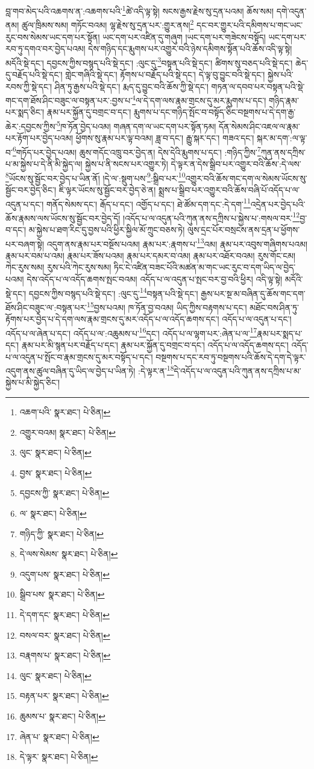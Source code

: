 བླ་གབ་མེད་པའི་འཆགས་ན་:འཆགས་པའི་\footnote{འཆག་པའི་  སྣར་ཐང་།  པེ་ཅིན། }ཚེ་འདི་ལྟ་སྟེ། སངས་རྒྱས་རྗེས་སུ་དྲན་པའམ། ཆོས་སམ། དགེ་འདུན་ནམ། ཚུལ་ཁྲིམས་སམ། གཏོང་བའམ། ལྷ་རྗེས་སུ་དྲན་པར་:གྱུར་ནས།\footnote{འགྱུར་བའམ།  སྣར་ཐང་།  པེ་ཅིན། } དང་བར་གྱུར་པའི་དམིགས་པ་གང་ཡང་རུང་བས་སེམས་ཡང་དག་པར་སྟོན། ཡང་དག་པར་འཛིན་དུ་གཞུག །ཡང་དག་པར་གཟེངས་བསྟོད། ཡང་དག་པར་རབ་ཏུ་དགའ་བར་བྱེད་པའམ། དེས་གཉིད་དང་རྨུགས་པར་འགྱུར་བའི་ཉེས་དམིགས་སྟོན་པའི་ཆོས་འདི་ལྟ་སྟེ། མདོའི་སྡེ་དང་། དབྱངས་ཀྱིས་བསྙད་པའི་སྡེ་དང་། :ལུང་དུ་\footnote{ལུང་  སྣར་ཐང་།  པེ་ཅིན། }བསྟན་པའི་སྡེ་དང་། ཚིགས་སུ་བཅད་པའི་སྡེ་དང་། ཆེད་དུ་བརྗོད་པའི་སྡེ་དང་། གླེང་གཞིའི་སྡེ་དང་། རྟོགས་པ་བརྗོད་པའི་སྡེ་དང་། དེ་ལྟ་བུ་བྱུང་བའི་སྡེ་དང་། སྐྱེས་པའི་རབས་ཀྱི་སྡེ་དང་། ཤིན་ཏུ་རྒྱས་པའི་སྡེ་དང་། རྨད་དུ་བྱུང་བའི་ཆོས་ཀྱི་སྡེ་དང་། གཏན་ལ་དབབ་པར་བསྟན་པའི་སྡེ་གང་དག་ཐོས་ཤིང་བཟུང་ལ་བསྟན་པར་:བྱས་པ་\footnote{བྱས་  སྣར་ཐང་།  པེ་ཅིན། }ལ་དེ་དག་ལས་རྣམ་གྲངས་དུ་མར་རྨུགས་པ་དང་། གཉིད་རྣམ་པར་སྨད་ཅིང་། རྣམ་པར་སྐྱོན་དུ་བགྲང་བ་དང་། རྨུགས་པ་དང་གཉིད་སྤོང་བ་བསྟོད་ཅིང་བསྔགས་པ་དེ་དག་རྒྱ་ཆེར་:དབྱངས་ཀྱིས་\footnote{དབྱངས་ཀྱི་  སྣར་ཐང་།  པེ་ཅིན། }ཁ་ཏོན་བྱེད་པའམ། གཞན་དག་ལ་ཡང་དག་པར་སྟོན་ཏམ། དོན་སེམས་ཤིང་འཇལ་ལ་རྣམ་པར་རྟོག་པར་བྱེད་པའམ། ཕྱོགས་སུ་རྣམ་པར་ལྟ་བའམ། ཟླ་བ་དང་། རྒྱུ་སྐར་དང་། གཟའ་དང་། སྐར་མ་དག་:ལ་ལྟ་བ་\footnote{ལ་  སྣར་ཐང་།  པེ་ཅིན། }གཏོད་པར་བྱེད་པའམ། ཆུས་གདོང་འཁྲུ་བར་བྱེད་ན། དེས་དེའི་རྨུགས་པ་དང་། :གཉིད་ཀྱིས་\footnote{གཉིད་ཀྱི་  སྣར་ཐང་།  པེ་ཅིན། }ཀུན་ནས་དཀྲིས་པ་མ་སྐྱེས་པ་དེ་ནི་མི་སྐྱེད་ལ། སྐྱེས་པ་ནི་སངས་པར་འགྱུར་ཏེ། དེ་ལྟར་ན་དེས་སྒྲིབ་པར་འགྱུར་བའི་ཆོས་:དེ་ལས་\footnote{དེ་ལས་སེམས་  སྣར་ཐང་།  པེ་ཅིན། }ཡོངས་སུ་སྦྱོང་བར་བྱེད་པ་ཡིན་ནོ། །དེ་ལ་:སྡུག་པས་\footnote{འདུག་པས་  སྣར་ཐང་།  པེ་ཅིན། }:སྒྲིབ་པར་\footnote{སྒྲིབ་པས་  སྣར་ཐང་།  པེ་ཅིན། }འགྱུར་བའི་ཆོས་གང་དག་ལ་སེམས་ཡོངས་སུ་སྦྱོང་བར་བྱེད་ཅིང་། ཇི་ལྟར་ཡོངས་སུ་སྦྱོང་བར་བྱེད་ཅེ་ན། སྨྲས་པ་སྒྲིབ་པར་འགྱུར་བའི་ཆོས་བཞི་པོ་འདོད་པ་ལ་འདུན་པ་དང་། གནོད་སེམས་དང་། རྒོད་པ་དང་། འགྱོད་པ་དང་། ཐེ་ཚོམ་དག་དང་:དེ་དག་\footnote{དེ་དག་དང་  སྣར་ཐང་།  པེ་ཅིན། }འདྲེན་པར་བྱེད་པའི་ཆོས་རྣམས་ལས་ཡོངས་སུ་སྦྱོང་བར་བྱེད་དོ། །འདོད་པ་ལ་འདུན་པའི་ཀུན་ནས་དཀྲིས་པ་སྐྱེས་པ་:གསལ་བར་\footnote{བསལ་བར་  སྣར་ཐང་།  པེ་ཅིན། }བྱ་བ་དང་། མ་སྐྱེས་པ་ཐག་རིང་དུ་བྱས་པའི་ཕྱིར་སྐྱིལ་མོ་ཀྲུང་བཅས་ཏེ། ལུས་དྲང་པོར་བསྲངས་ནས་དྲན་པ་ཕྱོགས་པར་བཞག་སྟེ། འདུག་ནས་རྣམ་པར་བསྔོས་པའམ། རྣམ་པར་:རྣགས་པ་\footnote{བརྣགས་པ་  སྣར་ཐང་།  པེ་ཅིན། }འམ། རྣམ་པར་འབུས་གཞིགས་པའམ། རྣམ་པར་བམ་པ་འམ། རྣམ་པར་ཟོས་པའམ། རྣམ་པར་དམར་བ་འམ། རྣམ་པར་འཐོར་བའམ། རུས་གོང་ངམ། ཀེང་རུས་སམ། རུས་པའི་ཀེང་རུས་སམ། ཏིང་ངེ་འཛིན་བཟང་པོའི་མཚན་མ་གང་ཡང་རུང་བ་དག་ཡིད་ལ་བྱེད་པའམ། དེས་འདོད་པ་ལ་འདོད་ཆགས་སྤང་བའམ། འདོད་པ་ལ་འདུན་པ་སྤང་བར་བྱ་བའི་ཕྱིར། འདི་ལྟ་སྟེ། མདོའི་སྡེ་དང་། དབྱངས་ཀྱིས་བསྙད་པའི་སྡེ་དང་། :ལུང་དུ་\footnote{ལུང་  སྣར་ཐང་།  པེ་ཅིན། }བསྟན་པའི་སྡེ་དང་། རྒྱས་པར་སྔ་མ་བཞིན་དུ་ཆོས་གང་དག་ཐོས་ཤིང་བཟུང་ལ་:བསྟན་པར་\footnote{བརྟན་པར་  སྣར་ཐང་།  པེ་ཅིན། }བྱས་པའམ། ཁ་ཏོན་བྱ་བའམ། ཡིད་ཀྱིས་བརྟགས་པ་དང་། མཐོང་བས་ཤིན་ཏུ་རྟོགས་པར་བྱེད་པ་དེ་དག་ལས་རྣམ་གྲངས་དུ་མར་འདོད་པ་ལ་འདོད་ཆགས་དང་། འདོད་པ་ལ་འདུན་པ་དང་། འདོད་པ་ལ་ཞེན་པ་དང་། འདོད་པ་ལ་:འཆུམས་པ་\footnote{ཆུམས་པ་  སྣར་ཐང་།  པེ་ཅིན། }དང་། འདོད་པ་ལ་ལྷག་པར་:ཞེན་པ་ལ་\footnote{ཞེན་པ་  སྣར་ཐང་།  པེ་ཅིན། }རྣམ་པར་སྨད་པ་དང་། རྣམ་པར་མི་སྙན་པར་བརྗོད་པ་དང་། རྣམ་པར་སྐྱོན་དུ་བགྲང་བ་དང་། འདོད་པ་ལ་འདོད་ཆགས་དང་། འདོད་པ་ལ་འདུན་པ་སྤོང་བ་རྣམ་གྲངས་དུ་མར་བསྟོད་པ་དང་། བསྔགས་པ་དང་རབ་ཏུ་བསྔགས་པའི་ཆོས་དེ་དག་དེ་ལྟར་འདུག་ནས་ཚུལ་བཞིན་དུ་ཡིད་ལ་བྱེད་པ་ཡིན་ཏེ། :དེ་ལྟར་ན་\footnote{དེ་ལྟར་  སྣར་ཐང་།  པེ་ཅིན། }དེ་འདོད་པ་ལ་འདུན་པའི་ཀུན་ནས་དཀྲིས་པ་མ་སྐྱེས་པ་མི་སྐྱེད་ཅིང་། 